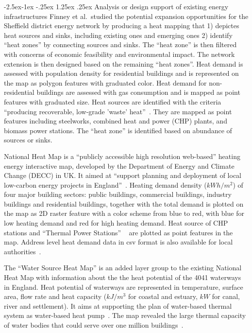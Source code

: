 \documentclass[hidelinks,12pt]{article}
\makeatletter
\renewcommand\paragraph{\@startsection{paragraph}{4}{\z@}%
            {-2.5ex\@plus -1ex \@minus -.25ex}%
            {1.25ex \@plus .25ex}%
            {\normalfont\normalsize\bfseries}}
\makeatother
\begin{document}
\paragraph{Analysis or design support of existing energy
  infrastructures}\label{infra}
Finney et al.\ studied the potential expansion opportunities for the
Sheffield district energy network by producing a heat mapping that 1)
depictes heat sources and sinks, including existing ones and emerging
ones 2) identify ``heat zones'' by connecting sources and sinks. The
``heat zone'' is then filtered with concerns of economic feasibility
and environmental impact. The network extension is then designed
based on the remaining ``heat zones''. Heat demand is assessed with
population density for residential buildings and is represented on the
map as polygon features with graduated color. Heat demand for
non-residential buildings are assessed with gas consumption and is
mapped as point features with graduated size. Heat sources are
identified with the criteria ``producing recoverable, low-grade
'waste' heat''~\cite{Finney2012165}. They are mapped as point features
including steelworks, combined heat and power (CHP) plants, and
biomass power stations. The ``heat zone'' is identified based on
abundance of sources or sinks.

National Heat Map is a ``publicly accessible high resolution
web-based'' heating energy interactive map, developed by the
Department of Energy and Climate Change (DECC) in UK. It aimed at
``support planning and deployment of local low-carbon energy projects
in England''~\cite{heatMap2015}. Heating demand density ($kWh/m^2$) of
four major building sectors: public buildings, commercial buildings,
industry buildings and residential buildings, together with the total
demand is plotted on the map as 2D raster feature with a color scheme
from blue to red, with blue for low heating demand and red for high
heating demand. Heat source of CHP stations and ``Thermal Power
Stations'' ~\cite{heatMap2012} are plotted as point features in the
map. Address level heat demand data in csv format is also available
for local authorities~\cite{heatMapLocal2012}. 

The ``Water Source Heat Map'' is an added layer group to the existing
National Heat Map with information about the the heat potential of the
4041 waterways in England. Heat potential of waterways are represented
in temperature, surface area, flow rate and heat capacity ($kJ/m^3$
for coastal and estuary, $kW$ for canal, river and settlement). It
aims at supporting the plan of water-based thermal system as
water-based heat pump~\cite{waterHeatMap}. The map revealed the large
thermal capacity of water bodies that could serve over one million
buildings~\cite{waterHeatMap}.
\end{document}
